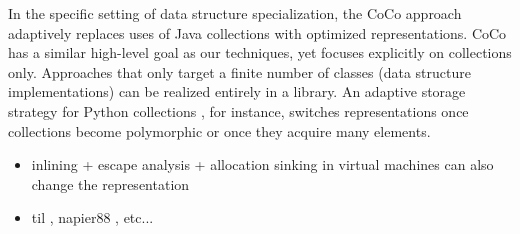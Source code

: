 In the specific setting of data structure specialization, the CoCo
approach~\cite{Xu:2013:CSA:2524984.2524986} adaptively replaces uses
of Java collections with optimized representations.  CoCo has a
similar high-level goal as our techniques, yet focuses explicitly on
collections only.  Approaches that only target a finite number of
classes (data structure implementations) can be realized entirely in a
library. An adaptive storage strategy for Python collections
\cite{Bolz:2013:SSC:2509136.2509531}, for instance, switches
representations once collections become polymorphic or once they
acquire many elements.






\begin{itemize}

  \item inlining + escape analysis + allocation sinking in virtual machines can also change the representation


  \item til \cite{tarditi-til} \cite{harper-intensional-type-analysis}, napier88 \cite{morrison-napier88}, etc...


\end{itemize}
